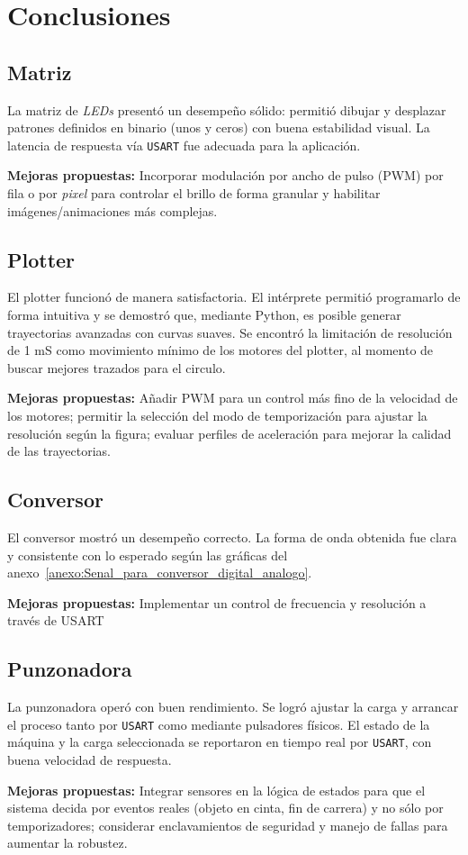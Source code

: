 
\section{Conclusiones}

\subsection{Matriz}
La matriz de \textit{LEDs} presentó un desempeño sólido: permitió dibujar y desplazar patrones definidos en binario (unos y ceros) con buena estabilidad visual. La latencia de respuesta vía \texttt{USART} fue adecuada para la aplicación. 

\textbf{Mejoras propuestas:} Incorporar modulación por ancho de pulso (PWM) por fila o por \textit{pixel} para controlar el brillo de forma granular y habilitar imágenes/animaciones más complejas.

\subsection{Plotter}
El plotter funcionó de manera satisfactoria. El intérprete permitió programarlo de forma intuitiva y se demostró que, mediante Python, es posible generar trayectorias avanzadas con curvas suaves. Se encontró la limitación de resolución de 1 mS como movimiento mínimo de los motores del plotter, al momento de buscar mejores trazados para el circulo.

\textbf{Mejoras propuestas:} Añadir PWM para un control más fino de la velocidad de los motores; permitir la selección del modo de temporización para ajustar la resolución según la figura; evaluar perfiles de aceleración para mejorar la calidad de las trayectorias.

\subsection{Conversor}
El conversor mostró un desempeño correcto. La forma de onda obtenida fue clara y consistente con lo esperado según las gráficas del anexo~\ref{anexo:Senal_para_conversor_digital_analogo}. 

\textbf{Mejoras propuestas:} Implementar un control de frecuencia y resolución a través de USART

\subsection{Punzonadora}
La punzonadora operó con buen rendimiento. Se logró ajustar la carga y arrancar el proceso tanto por \texttt{USART} como mediante pulsadores físicos. El estado de la máquina y la carga seleccionada se reportaron en tiempo real por \texttt{USART}, con buena velocidad de respuesta.

\textbf{Mejoras propuestas:} Integrar sensores en la lógica de estados para que el sistema decida por eventos reales (objeto en cinta, fin de carrera) y no sólo por temporizadores; considerar enclavamientos de seguridad y manejo de fallas para aumentar la robustez.
